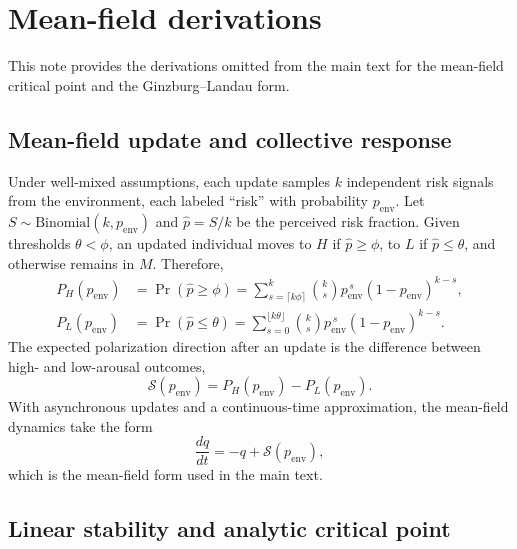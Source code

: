 \section{Mean-field derivations}
\label{supp:s2-mean-field}

This note provides the derivations omitted from the main text for the mean-field critical point and the Ginzburg--Landau form.

\subsection{Mean-field update and collective response}

Under well-mixed assumptions, each update samples $k$ independent risk signals from the environment, each labeled ``risk'' with probability $p_{\text{env}}$. Let $S\sim\text{Binomial}(k,p_{\text{env}})$ and $\hat{p}=S/k$ be the perceived risk fraction. Given thresholds $\theta<\phi$, an updated individual moves to $H$ if $\hat{p}\ge \phi$, to $L$ if $\hat{p}\le \theta$, and otherwise remains in $M$. Therefore,
\begin{align}
P_H(p_{\text{env}}) &= \Pr(\hat{p}\ge \phi)=\sum_{s=\lceil k\phi\rceil}^{k}\binom{k}{s}p_{\text{env}}^{\,s}(1-p_{\text{env}})^{k-s},\\
P_L(p_{\text{env}}) &= \Pr(\hat{p}\le \theta)=\sum_{s=0}^{\lfloor k\theta\rfloor}\binom{k}{s}p_{\text{env}}^{\,s}(1-p_{\text{env}})^{k-s}.
\end{align}
The expected polarization direction after an update is the difference between high- and low-arousal outcomes,
\begin{equation}
\mathcal{S}(p_{\text{env}})=P_H(p_{\text{env}})-P_L(p_{\text{env}}).
\end{equation}
With asynchronous updates and a continuous-time approximation, the mean-field dynamics take the form
\begin{equation}
\frac{dq}{dt}=-q+\mathcal{S}(p_{\text{env}}),
\end{equation}
which is the mean-field form used in the main text.

\subsection{Linear stability and analytic critical point}

